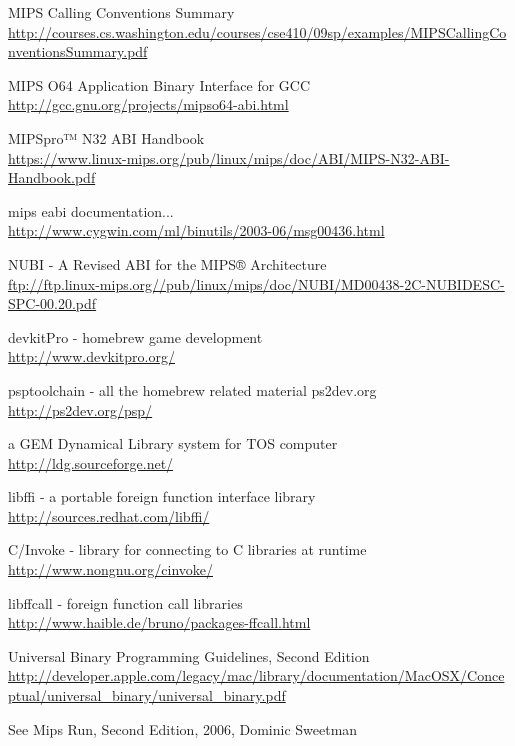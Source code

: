 \begin{thebibliography}{99}
	MIPS Calling Conventions Summary\\
	\url{http://courses.cs.washington.edu/courses/cse410/09sp/examples/MIPSCallingConventionsSummary.pdf}

	MIPS O64 Application Binary Interface for GCC\\
	\url{http://gcc.gnu.org/projects/mipso64-abi.html}

	MIPSpro™ N32 ABI Handbook\\
	\url{https://www.linux-mips.org/pub/linux/mips/doc/ABI/MIPS-N32-ABI-Handbook.pdf}

	mips eabi documentation...\\
	\url{http://www.cygwin.com/ml/binutils/2003-06/msg00436.html}

	NUBI - A Revised ABI for the MIPS® Architecture\\
	\url{ftp://ftp.linux-mips.org//pub/linux/mips/doc/NUBI/MD00438-2C-NUBIDESC-SPC-00.20.pdf}

	devkitPro - homebrew game development\\
	\url{http://www.devkitpro.org/}

	psptoolchain - all the homebrew related material ps2dev.org\\
	\url{http://ps2dev.org/psp/}

	a GEM Dynamical Library system for TOS computer\\
	\url{http://ldg.sourceforge.net/}

	libffi - a portable foreign function interface library\\
	\url{http://sources.redhat.com/libffi/}

	C/Invoke - library for connecting to C libraries at runtime\\
	\url{http://www.nongnu.org/cinvoke/}

	libffcall - foreign function call libraries\\
	\url{http://www.haible.de/bruno/packages-ffcall.html}

	Universal Binary Programming Guidelines, Second Edition\\
	\url{http://developer.apple.com/legacy/mac/library/documentation/MacOSX/Conceptual/universal\_binary/universal\_binary.pdf}

	See Mips Run, Second Edition, 2006, Dominic Sweetman

\end{thebibliography}

